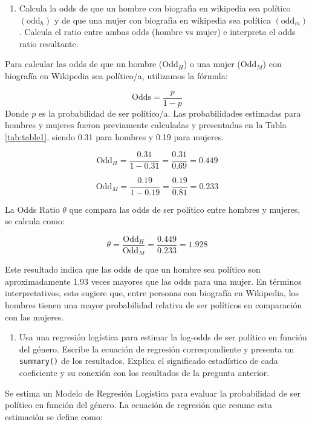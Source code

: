 \documentclass[
  12pt,
  a4paper,
]{article}
\providecommand{\tightlist}{%
  \setlength{\itemsep}{0pt}\setlength{\parskip}{0pt}}
\begin{document}
\begin{enumerate}
\def\labelenumi{\arabic{enumi}.}
\tightlist
\item
  Calcula la odds de que un hombre con biografìa en wikipedia sea político \((\text{odd}_h)\) y de que una mujer con biografìa en wikipedia sea política \((\text{odd}_m)\). Calcula el ratio entre ambas odds (hombre vs mujer) e interpreta el odds ratio resultante.
\end{enumerate}

Para calcular las odds de que un hombre (\(\text{Odd}_H\)) o una mujer (\(\text{Odd}_M\)) con biografía en Wikipedia sea político/a, utilizamos la fórmula:

\[
\text{Odds} = \frac{p}{1-p}
\] Donde \(p\) es la probabilidad de ser político/a. Las probabilidades estimadas para hombres y mujeres fueron previamente calculadas y presentadas en la Tabla \ref{tab:table1}, siendo 0.31 para hombres y 0.19 para mujeres.

\[
\text{Odd}_H = \frac{0.31}{1-0.31} = \frac{0.31}{0.69} =  0.449
\]

\[
\text{Odd}_M = \frac{0.19}{1-0.19} = \frac{0.19}{0.81} = 0.233
\]

La Odds Ratio \(\theta\) que compara las odds de ser político entre hombres y mujeres, se calcula como:

\[
\theta = \frac{\text{Odd}_H}{\text{Odd}_M} = \frac{0.449}{0.233} = 1.928
\]

Este resultado indica que las odds de que un hombre sea político son aproximadamente 1.93 veces mayores que las odds para una mujer. En términos interpretativos, esto sugiere que, entre personas con biografía en Wikipedia, los hombres tienen una mayor probabilidad relativa de ser políticos en comparación con las mujeres.

\begin{enumerate}
\def\labelenumi{\arabic{enumi}.}
\setcounter{enumi}{1}
\tightlist
\item
  Usa una regresión logística para estimar la log-odds de ser político en función del género. Escribe la ecuación de regresión correspondiente y presenta un \texttt{summary()} de los resultados. Explica el significado estadístico de cada coeficiente y su conexión con los resultados de la pregunta anterior.
\end{enumerate}

Se estima un Modelo de Regresión Logística para evaluar la probabilidad de ser político en función del género. La ecuación de regresión que resume esta estimación se define como:
\end{document}
